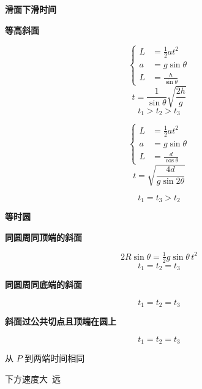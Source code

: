 \textbf{滑面下滑时间} %

\textbf{等高斜面}


\[
\left\{\begin{aligned}
L&=\tfrac{1}{2}at^{2}\\
a&=g\sin\theta\\
L&=\frac{h}{\sin\theta}
\end{aligned}\right.
\]
\[
t=\frac{1}{\sin\theta}\sqrt{\frac{2h}{g}}
\]
\[
t_1>t_2>t_3
\]


\[
\left\{\begin{aligned}
L&=\tfrac{1}{2}at^{2}\\
a&=g\sin\theta\\
L&=\frac{d}{\cos\theta}
\end{aligned}\right.
\]
\[
t=\sqrt{\frac{4d}{g\sin 2\theta}}
\]


\[
t_1=t_3>t_2
\]

\textbf{等时圆}

\textbf{同圆周同顶端的斜面}


\[
2R\sin\theta=\tfrac{1}{2}g\sin\theta\,t^{2}
\]
\[
t_1=t_2=t_3
\]

\textbf{同圆周同底端的斜面}


\[
t_1=t_2=t_3
\]

\textbf{斜面过公共切点且顶端在圆上}


\[
t_1=t_2=t_3
\]

从 $P$ 到两端时间相同

下方速度大\ 远


